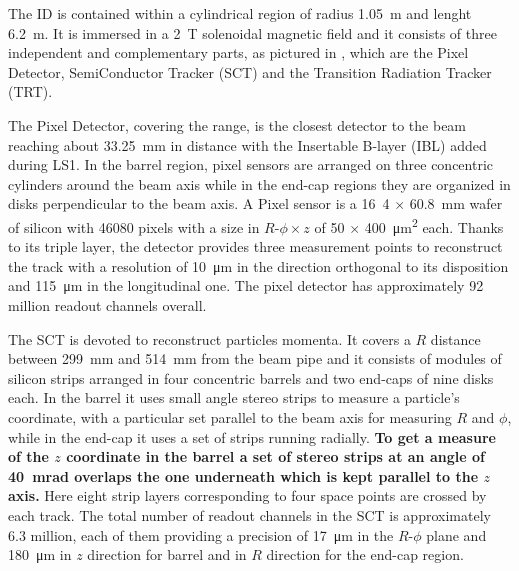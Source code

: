 The ID is contained within a cylindrical region of radius \SI{1.05}{\m} and lenght \SI{6.2}{\m}. It is immersed in a \SI{2}{\tesla} solenoidal magnetic field and it consists of three independent and complementary parts, as pictured in \Fig{\ref{fig:xsecID}}, which are the Pixel Detector, SemiConductor Tracker (SCT) and the Transition Radiation Tracker (TRT).

The Pixel Detector, covering the  range, is the closest detector to the beam reaching about \SI{33.25}{\mm} in distance with the Insertable B-layer (IBL) added during LS1. In the barrel region, pixel sensors are arranged on three concentric cylinders around the beam axis while in the end-cap regions they are organized in disks perpendicular to the beam axis. A Pixel sensor is a \si{16.4} $\times$ \SI{60.8}{\mm} wafer of silicon with \num{46080} pixels with a size in $R$-$\phi \times z$ of  \si{50} $\times$ \SI{400}{\um\squared} each. Thanks to its triple layer, the detector provides three measurement points to reconstruct the track with a resolution of \SI{10}{\um} in the direction orthogonal to its disposition and \SI{115}{\um} in the longitudinal one. The pixel detector has approximately \num{92} million readout channels overall.

The SCT is devoted to reconstruct particles momenta. It covers a $R$ distance between \SI{299}{\mm} and \SI{514}{\mm}  from the beam pipe and it consists of modules of silicon strips arranged in four concentric barrels and two end-caps of nine disks each. In the barrel it uses small angle stereo strips to measure a particle's coordinate, with a particular set parallel to the beam axis for measuring $R$ and $\phi$, while in the end-cap it uses a set of strips running radially. 
{\bfseries To get a measure of the $z$ coordinate in the barrel a set of stereo strips at an angle of \SI{40}{mrad} overlaps the one underneath which is kept parallel to the $z$ axis.}
Here eight strip layers corresponding to four space points are crossed by each track. The total number of readout channels in the SCT is approximately 6.3 million, each of them providing a precision of \SI{17}{\um} in the $R$-$\phi$ plane and \SI{180}{\um} in $z$ direction for barrel and in $R$ direction for the end-cap region.

